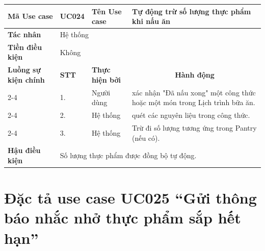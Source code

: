 \begin{longtable}{|p{2.7cm}|p{0.8cm}|p{2.6cm}|p{7.3cm}|}
\hline
\cellcolor[HTML]{D5F5E3}\textbf{Mã Use case} & \multicolumn{1}{l|}{UC024} & \cellcolor[HTML]{D5F5E3}\textbf{Tên Use case} & Tự động trừ số lượng thực phẩm khi nấu ăn \\ \hline
\cellcolor[HTML]{D5F5E3}\textbf{Tác nhân} & \multicolumn{3}{p{10.7cm}|}{Hệ thống} \\ \hline
\cellcolor[HTML]{D5F5E3}\textbf{Tiền điều kiện} & \multicolumn{3}{p{10.7cm}|}{Không} \\ \hline

\cellcolor[HTML]{D5F5E3}\textbf{Luồng sự kiện chính} & \cellcolor[HTML]{FDEBD0}\textbf{STT} & \cellcolor[HTML]{FDEBD0}\textbf{Thực hiện bởi} & \multicolumn{1}{c|}{\cellcolor[HTML]{FDEBD0}\textbf{Hành động}} \\ \cline{2-4} 
\cellcolor[HTML]{D5F5E3} & 1. & Người dùng & xác nhận "Đã nấu xong" một công thức hoặc một món trong Lịch trình bữa ăn. \\ \cline{2-4} 
\cellcolor[HTML]{D5F5E3} & 2. & Hệ thống & quét các nguyên liệu trong công thức. \\ \cline{2-4} 
\cellcolor[HTML]{D5F5E3} & 3. & Hệ thống & Trừ đi số lượng tương ứng trong Pantry (nếu có). \\ \hline

\cellcolor[HTML]{D5F5E3}\textbf{Hậu điều kiện} & \multicolumn{3}{p{10.7cm}|}{Số lượng thực phẩm được đồng bộ tự động.} \\ \hline
\end{longtable}
\endgroup

\section{Đặc tả use case UC025 ``Gửi thông báo nhắc nhở thực phẩm sắp hết hạn''}
\vspace{0.5cm}

\begingroup
\renewcommand{\arraystretch}{1.5}

